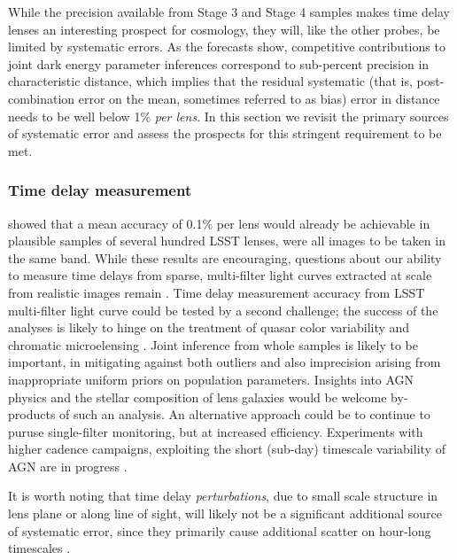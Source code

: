 While the precision available from Stage 3 and Stage 4 samples makes
time delay lenses an interesting prospect for cosmology, they will,
like the other probes, be limited by systematic errors. As the
forecasts show, competitive contributions to joint dark energy
parameter inferences correspond to sub-percent precision in
characteristic distance, which implies that the residual systematic
(that is, post-combination error on the mean, sometimes referred to as
bias) error in distance needs to be well below 1\% {\it per lens}. In
this section we revisit the primary sources of systematic error and
assess the prospects for this stringent requirement to be met.

\subsubsection{Time delay measurement}

\citet{LiaoEtal2015} showed that a 
mean accuracy of 0.1\% per lens would already be achievable in
plausible samples of several hundred LSST lenses, were all images to
be taken in the same band.  While these results are encouraging,
questions about our ability to measure time delays from sparse,
multi-filter light curves extracted at scale from realistic images
remain \citep{TCM13}.  Time delay measurement accuracy from LSST
multi-filter light curve could be tested by a second challenge; the
success of the analyses is likely to hinge on the treatment of quasar
color variability \citep[see e.g.\ ][and references
therein]{Sch++12,SunEtal2014} and chromatic microelensing
\citep[see e.g.][and references therein]{HainlineEtal2013}.
Joint inference from whole samples is likely to
be important, in mitigating against both outliers and also imprecision
arising from inappropriate uniform priors on  population parameters.
Insights into AGN physics and the stellar composition  of lens galaxies
would be welcome by-products of such an analysis. An alternative approach
could be to continue to puruse single-filter monitoring, but at
increased efficiency. Experiments with higher cadence campaigns,
exploiting the short (sub-day) timescale variability of AGN are in
progress \citep[][F.~Courbin, priv.\ comm.]{BorosonEtal2016}.

It is worth noting that time delay {\it perturbations},  due to small
scale structure in lens plane or along line of sight, will likely not be
a significant  additional source of systematic error, since they
primarily cause additional  scatter on hour-long timescales
\citep{K+M09}.


